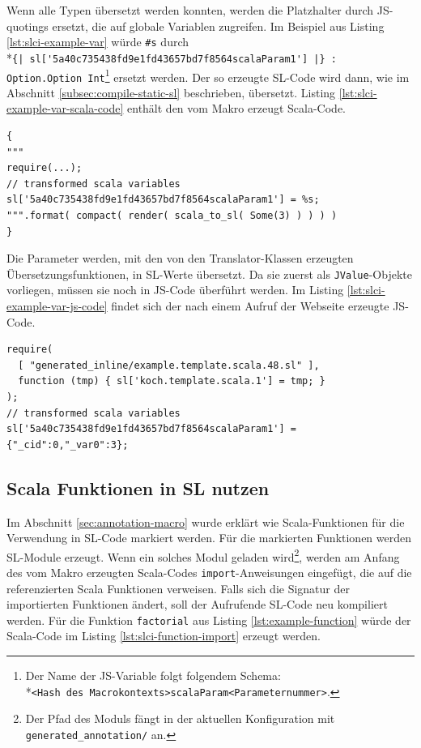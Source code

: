 \documentclass[12pt,bibtotoc]{scrreprt}
\begin{document}
Wenn alle Typen übersetzt werden konnten, werden die Platzhalter durch \ac{JS}-quotings ersetzt, die auf globale Variablen zugreifen. Im Beispiel aus Listing \ref{lst:slci-example-var} würde \lstinline!#s! durch \\*\lstinline!{| sl['5a40c735438fd9e1fd43657bd7f8564scalaParam1'] |} : Option.Option Int!\footnote{Der Name der JS-Variable folgt folgendem Schema: \\*\lstinline!<Hash des Macrokontexts>scalaParam<Parameternummer>!.} ersetzt werden. Der so erzeugte SL-Code wird dann, wie im Abschnitt \ref{subsec:compile-static-sl} beschrieben, übersetzt. 
Listing \ref{lst:slci-example-var-scala-code} enthält den vom Makro erzeugt Scala-Code. 

\begin{lstlisting}[caption={Erzeugter Scala-Code zum Listing \ref{lst:slci-example-var}}, label=lst:slci-example-var-scala-code, float=h]
{ 
"""
require(...);
// transformed scala variables    
sl['5a40c735438fd9e1fd43657bd7f8564scalaParam1'] = %s;
""".format( compact( render( scala_to_sl( Some(3) ) ) ) )
}
\end{lstlisting}

Die Parameter werden, mit den von den Translator-Klassen erzeugten Übersetzungsfunktionen, in \ac{SL}-Werte übersetzt. Da sie zuerst als \lstinline!JValue!-Objekte vorliegen, müssen sie noch in \ac{JS}-Code überführt werden. Im Listing \ref{lst:slci-example-var-js-code} findet sich der nach einem Aufruf der Webseite erzeugte \ac{JS}-Code.

\begin{lstlisting}[caption={JS-Code zum Listing \ref{lst:slci-example-var}}, label=lst:slci-example-var-js-code, float=h]
require( 
  [ "generated_inline/example.template.scala.48.sl" ],
  function (tmp) { sl['koch.template.scala.1'] = tmp; }
);
// transformed scala variables 
sl['5a40c735438fd9e1fd43657bd7f8564scalaParam1'] = {"_cid":0,"_var0":3};
\end{lstlisting}

\subsection{Scala Funktionen in SL nutzen}
\label{subsec:use-scala-function-in-sl}

Im Abschnitt \ref{sec:annotation-macro} wurde erklärt wie Scala-Funktionen für die Verwendung in \ac{SL}-Code markiert werden. Für die markierten Funktionen werden \ac{SL}-Module erzeugt. Wenn ein solches Modul geladen wird\footnote{Der Pfad des Moduls fängt in der aktuellen Konfiguration mit \lstinline!generated_annotation/! an.}, werden am Anfang des vom Makro erzeugten Scala-Codes \lstinline!import!-Anweisungen eingefügt, die auf die referenzierten Scala Funktionen verweisen. Falls sich die Signatur der importierten Funktionen ändert, soll der Aufrufende SL-Code neu kompiliert werden.
Für die Funktion \lstinline!factorial! aus Listing \ref{lst:example-function} würde der Scala-Code im Listing \ref{lst:slci-function-import} erzeugt werden.
\end{document}
